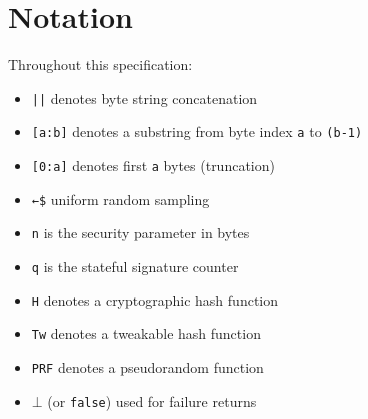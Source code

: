 \section{Notation}

Throughout this specification:

\begin{itemize}
    \item[] \texttt{||} \quad denotes byte string concatenation
    \item[] \texttt{[a:b]} \quad denotes a substring from byte index \texttt{a} to \texttt{(b-1)}
    \item[] \texttt{[0:a]} \quad denotes first \texttt{a} bytes (truncation)
    \item[] \texttt{←\$} \quad uniform random sampling
    \item[] \texttt{n} \quad is the security parameter in bytes
    \item[] \texttt{q} \quad is the stateful signature counter
    \item[] \texttt{H} \quad denotes a cryptographic hash function
    \item[] \texttt{Tw} \quad denotes a tweakable hash function
    \item[] \texttt{PRF} \quad denotes a pseudorandom function
    \item[] \texttt{$\bot$} \quad (or \texttt{false}) used for failure returns
\end{itemize}